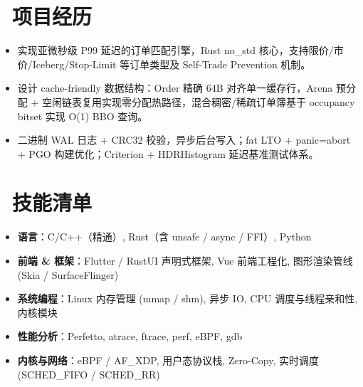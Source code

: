 \documentclass{resume}
\begin{document}

  \section{\faCode\ 项目经历}
\begin{onehalfspacing}
\begin{itemize}
  \item 实现亚微秒级 P99 延迟的订单匹配引擎，Rust no\_std 核心，支持限价/市价/Iceberg/Stop-Limit 等订单类型及 Self-Trade Prevention 机制。
  \item 设计 cache-friendly 数据结构：Order 精确 64B 对齐单一缓存行，Arena 预分配 + 空闲链表复用实现零分配热路径，混合稠密/稀疏订单簿基于 occupancy bitset 实现 O(1) BBO 查询。
  \item 二进制 WAL 日志 + CRC32 校验，异步后台写入；fat LTO + panic=abort + PGO 构建优化；Criterion + HDRHistogram 延迟基准测试体系。
\end{itemize}
\end{onehalfspacing}

\section{\faCogs\ 技能清单}
  \begin{itemize}[parsep=0.5ex]
      \item \textbf{语言}：C/C++（精通）, Rust（含 unsafe / async / FFI）, Python
      \item \textbf{前端 \& 框架}：Flutter / RustUI 声明式框架, Vue 前端工程化, 图形渲染管线 (Skia / SurfaceFlinger)
      \item \textbf{系统编程}：Linux 内存管理 (mmap / shm), 异步 IO, CPU 调度与线程亲和性, 内核模块
      \item \textbf{性能分析}：Perfetto, atrace, ftrace, perf, eBPF, gdb
      \item \textbf{内核与网络}：eBPF / AF\_XDP, 用户态协议栈, Zero-Copy, 实时调度 (SCHED\_FIFO / SCHED\_RR)
  \end{itemize}

\end{document}
